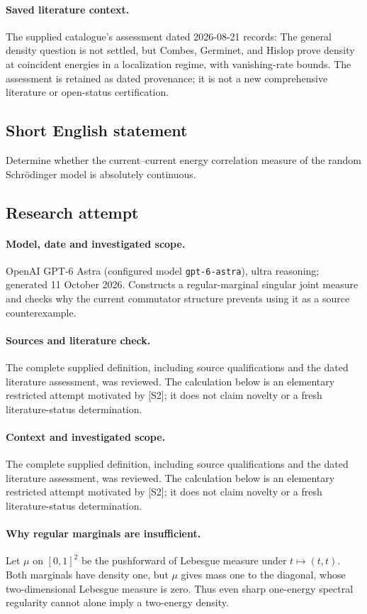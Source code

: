 \documentclass[11pt]{article}
\begin{document}
\paragraph{Saved literature context.} The supplied catalogue's assessment dated 2026-08-21 records: The general density question is not settled, but Combes, Germinet, and Hislop prove density at coincident energies in a localization regime, with vanishing-rate bounds. The assessment is retained as dated provenance; it is not a new comprehensive literature or open-status certification.
\subsection{Short English statement}
Determine whether the current--current energy correlation measure of the random Schrödinger model is absolutely continuous.
\subsection{Research attempt}
\paragraph{Model, date and investigated scope.}
OpenAI GPT-6 Astra (configured model \texttt{gpt-6-astra}), ultra reasoning; generated 11 October 2026. Constructs a regular-marginal singular joint measure and checks why the current commutator structure prevents using it as a source counterexample.

\paragraph{Sources and literature check.}
The complete supplied definition, including source qualifications and the dated literature assessment, was reviewed. The calculation below is an elementary restricted attempt motivated by [S2]; it does not claim novelty or a fresh literature-status determination.

\paragraph{Context and investigated scope.} The complete supplied definition, including source qualifications and the dated literature assessment, was reviewed. The calculation below is an elementary restricted attempt motivated by [S2]; it does not claim novelty or a fresh literature-status determination.

\paragraph{Why regular marginals are insufficient.} Let $\mu$ on $[0,1]^2$ be the pushforward of Lebesgue measure under $t\mapsto(t,t)$. Both marginals have density one, but $\mu$ gives mass one to the diagonal, whose two-dimensional Lebesgue measure is zero. Thus even sharp one-energy spectral regularity cannot alone imply a two-energy density.
\end{document}
